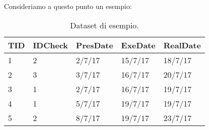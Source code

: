 Consideriamo a questo punto un esempio:


\begin{table}[H]
	\centering
	\begin{tabular}{l l l l l}
		TID & IDCheck & PresDate & ExeDate & RealDate \\
		\hline
		1 & 2 & 2/7/17 & 15/7/17 & 18/7/17\\
		2 & 3 & 3/7/17 & 16/7/17 & 20/7/17\\
		3 & 1 & 2/7/17 & 16/7/17 & 19/7/17\\
		4 & 1 & 5/7/17 & 19/7/17 & 19/7/17\\
		5 & 2 & 8/7/17 & 19/7/17 & 23/7/17\\
	
	\end{tabular}
	\caption{Dataset di esempio.}
	\label{tab:Dataset_di_esempio}
\end{table}

